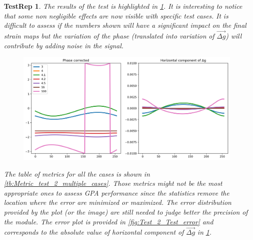 \documentclass[12pt, titlepage]{article}
\newtheorem{TestRep}{TestRep}
\begin{document}
\begin{TestRep}
The results of the test is highlighted in \cref{fig:Test_2_Test_results}. It is interesting to notice that some non negligible effects are now visible with specific test cases. It is difficult to assess if the numbers shown will have a significant impact on the final strain maps but the variation of the phase (translated into variation of $\overrightarrow{\Delta g}$) will contribute by adding noise in the signal.

\begin{figure}[H]
\begin{center}
\includegraphics[scale=0.5]{Figures/Test_2_test_results.png}
\caption{}
\label{fig:Test_2_Test_results}
\end{center}
\end{figure}

The table of metrics for all the cases is shown in \cref{tb:Metric_test_2_multiple_cases}. Those metrics might not be the most appropriate ones to assess GPA performance since the statistics remove the location where the error are minimized or maximized. The error distribution provided by the plot (or the image) are still needed to judge better the precision of the module. The error plot is provided in \cref{fig:Test_2_Test_error} and corresponds to the absolute value of horizontal component of $\overrightarrow{\Delta g}$ in \cref{fig:Test_2_Test_results}.


\end{TestRep}
\end{document}
